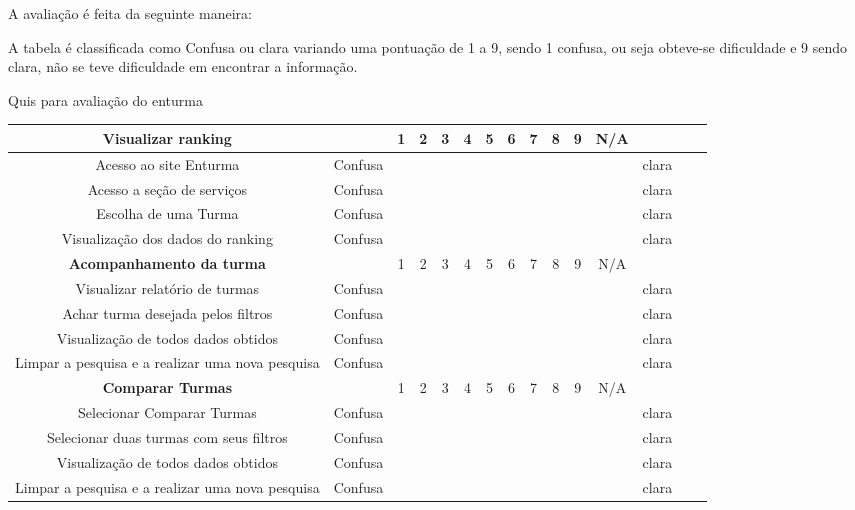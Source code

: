 \begin{itemize}
	A avaliação é feita da seguinte maneira:

		A tabela é classificada como Confusa ou clara variando uma pontuação de 1 a 9, sendo 1 confusa, ou seja  obteve-se dificuldade e 9 sendo clara, não se teve dificuldade em encontrar a informação.

		\begin{table}[H]
	{Quis para avaliação do enturma}
	\centering
	\begin{tabular}{|c|c|c|c|c|c|c|c|c|c|c|c|c|c|c|} 

		\hline
		   \textbf{Visualizar ranking} &  & 1 & 2 & 3 & 4 & 5 & 6 & 7 & 8 & 9 & N/A &  \\
		\hline
		   Acesso ao site Enturma & Confusa &  &  &  &  &  &  &  &  &  &  & clara \\ 
		\hline
		 Acesso a seção de serviços  & Confusa &  &  &  &  &  &  &  &  &  &  & clara \\ 
		\hline
		 Escolha de uma Turma  & Confusa &  &  &  &  &  &  &  &  &  &  & clara \\ 
		\hline
		 Visualização dos dados do ranking & Confusa &  &  &  &  &  &  &  &  &  &  & clara \\ 
		\hline
		   \textbf{Acompanhamento da turma} &  & 1 & 2 & 3 & 4 & 5 & 6 & 7 & 8 & 9 & N/A &  \\
		\hline
		 Visualizar relatório de turmas & Confusa &  &  &  &  &  &  &  &  &  &  & clara \\ 
		\hline
		  Achar turma desejada pelos filtros & Confusa &  &  &  &  &  &  &  &  &  &  & clara \\ 
		\hline
		  Visualização de todos dados obtidos & Confusa &  &  &  &  &  &  &  &  &  &  & clara \\ 
		\hline
		  Limpar a pesquisa e a realizar uma nova pesquisa & Confusa &  &  &  &  &  &  &  &  &  &  & clara \\ \hline
		\textbf{Comparar Turmas} &  & 1 & 2 & 3 & 4 & 5 & 6 & 7 & 8 & 9 & N/A &  \\
		\hline  
		  Selecionar Comparar Turmas & Confusa &  &  &  &  &  &  &  &  &  &  & clara \\ 
		\hline
		  Selecionar duas turmas com seus filtros & Confusa &  &  &  &  &  &  &  &  &  &  & clara \\ 
		\hline
		 Visualização de todos dados obtidos & Confusa &  &  &  &  &  &  &  &  &  &  & clara \\ 
		\hline
		Limpar a pesquisa e a realizar uma nova pesquisa & Confusa &  &  &  &  &  &  &  &  &  &  & clara \\ 

\end{tabular}
\end{table}
\end{itemize}
